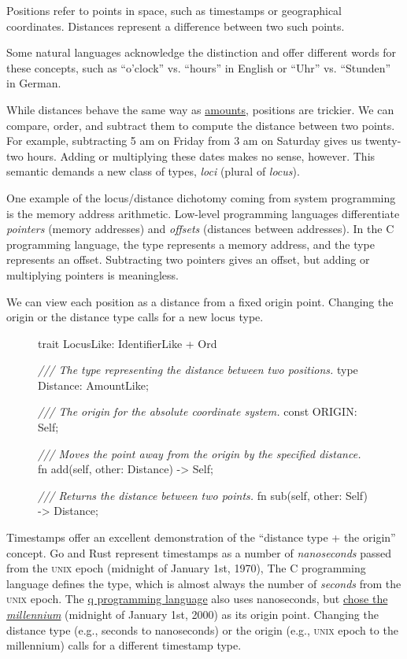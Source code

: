 \documentclass{article}
\begin{document}
Positions refer to points in space, such as timestamps or geographical coordinates.
Distances represent a difference between two such points.

Some natural languages acknowledge the distinction and offer different words for these concepts, such as ``o'clock'' vs. ``hours'' in English or ``Uhr'' vs. ``Stunden'' in German.

While distances behave the same way as \href{#amounts}{amounts}, positions are trickier.
We can compare, order, and subtract them to compute the distance between two points.
For example, subtracting 5 am on Friday from 3 am on Saturday gives us twenty-two hours.
Adding or multiplying these dates makes no sense, however.
This semantic demands a new class of types, \emph{loci} (plural of \emph{locus}).

One example of the locus/distance dichotomy coming from system programming is the memory address arithmetic.
Low-level programming languages differentiate \emph{pointers} (memory addresses) and \emph{offsets} (distances between addresses).
In the C programming language, the  type represents a memory address, and the  type represents an offset.
Subtracting two pointers gives an offset, but adding or multiplying pointers is meaningless.

We can view each position as a distance from a fixed origin point.
Changing the origin or the distance type calls for a new locus type.

\begin{figure}
\begin{code}
trait LocusLike: IdentifierLike + Ord {
  \emph{/// The type representing the distance between two positions.}
  type Distance: AmountLike;

  \emph{/// The origin for the absolute coordinate system.}
  const ORIGIN: Self;

  \emph{/// Moves the point away from the origin by the specified distance.}
  fn add(self, other: Distance) -> Self;

  \emph{/// Returns the distance between two points.}
  fn sub(self, other: Self) -> Distance;
}
\end{code}
\end{figure}

Timestamps offer an excellent demonstration of the ``distance type + the origin'' concept.
Go and Rust represent timestamps as a number of \emph{nanoseconds} passed from the \textsc{unix} epoch (midnight of January 1st, 1970),
The C programming language defines the \href{https://en.cppreference.com/w/c/chrono/time_t}{} type, which is almost always the number of \emph{seconds} from the \textsc{unix} epoch.
The \href{https://en.wikipedia.org/wiki/Q_(programming_language_from_Kx_Systems)}{q programming language} also uses nanoseconds, but \href{https://code.kx.com/q4m3/2_Basic_Data_Types_Atoms/#253-date-time-types}{chose the \emph{millennium}} (midnight of January 1st, 2000) as its origin point.
Changing the distance type (e.g., seconds to nanoseconds) or the origin (e.g., \textsc{unix} epoch to the millennium) calls for a different timestamp type.
\end{document}
